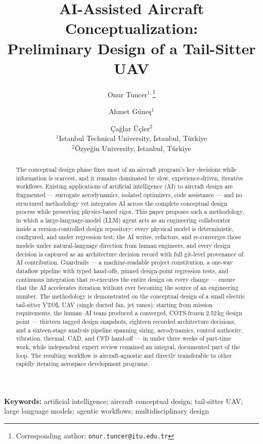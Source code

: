 \documentclass[11pt,a4paper]{article}
\title{\textbf{AI-Assisted Aircraft Conceptualization:\\
Preliminary Design of a Tail-Sitter UAV}}
\author{%
  Onur Tuncer$^{1,}$\thanks{Corresponding author: \texttt{onur.tuncer@itu.edu.tr}}
  \and Ahmet G\"une\c{s}$^{1}$
  \and \c{C}a\u{g}lar \"U\c{c}ler$^{2}$\\[1ex]
  \small $^{1}$Istanbul Technical University, Istanbul, T\"urkiye\\
  \small $^{2}$\"Ozye\u{g}in University, Istanbul, T\"urkiye%
}
\date{}
\begin{document}
\maketitle

\begin{abstract}
The conceptual design phase fixes most of an aircraft program's key
decisions while information is scarcest, and it remains dominated by
slow, experience-driven, iterative workflows. Existing applications of
artificial intelligence (AI) to aircraft design are fragmented ---
surrogate aerodynamics, isolated optimizers, code assistance --- and no
structured methodology yet integrates AI across the complete conceptual
design process while preserving physics-based rigor. This paper
proposes such a methodology, in which a large-language-model (LLM)
agent acts as an engineering collaborator inside a version-controlled
design repository: every physical model is deterministic, configured,
and under regression test; the AI writes, refactors, and re-converges
those models under natural-language direction from human engineers, and
every design decision is captured as an architecture decision record
with full git-level provenance of AI contribution. Guardrails --- a
machine-readable project constitution, a one-way dataflow pipeline with
typed hand-offs, pinned design-point regression tests, and continuous
integration that re-executes the entire design on every change ---
ensure that the AI accelerates iteration without ever becoming the
source of an engineering number. The methodology is demonstrated on the
conceptual design of a small electric tail-sitter VTOL UAV (single
ducted fan, jet vanes): starting from mission requirements, the
human--AI team produced a converged, COTS-frozen 2.52\,kg design point
--- thirteen tagged design snapshots, eighteen recorded architecture
decisions, and a sixteen-stage analysis pipeline spanning sizing,
aerodynamics, control authority, vibration, thermal, CAD, and CFD
hand-off --- in under three weeks of part-time work, while independent
expert review remained an integral, documented part of the loop. The
resulting workflow is aircraft-agnostic and directly transferable to
other rapidly iterating aerospace development programs.
\end{abstract}

\noindent\textbf{Keywords:} artificial intelligence; aircraft
conceptual design; tail-sitter UAV; large language models; agentic
workflows; multidisciplinary design






\end{document}

